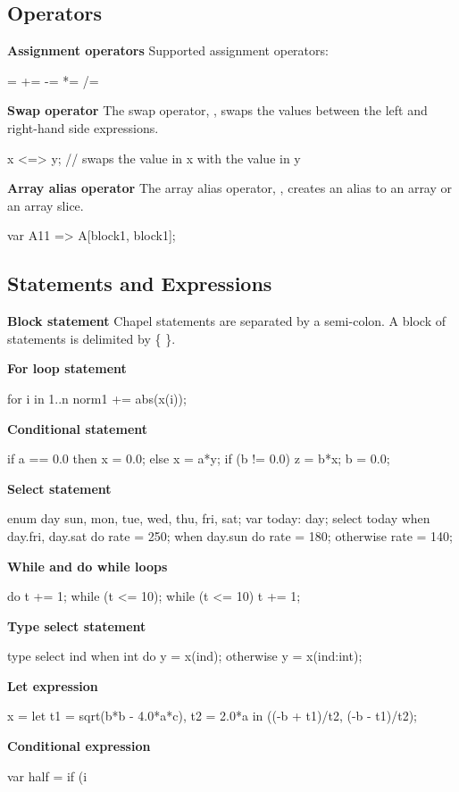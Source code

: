 \documentclass[landscape]{report}
\begin{document}
{\subsection*{Operators}  
{\bf Assignment operators} \newline
Supported assignment operators:
\begin{chapel}
 = += -= *= /= %
\end{chapel}
{\bf Swap operator} \newline
The swap operator, \chpl{<=>}, swaps the values between
the left and right-hand side expressions.
\begin{chapel}
x <=> y; // swaps the value in x with the value in y
\end{chapel}
{\bf Array alias operator} \newline
The array alias operator, \chpl{=>}, creates an alias
to an array or an array slice.  
\begin{chapel}
var A11 => A[block1, block1];
\end{chapel}
\subsection*{Statements and Expressions}
{\bf Block statement} \newline
Chapel statements are separated by a semi-colon.  A block
of statements is delimited by \{ \}.  

{\bf For loop statement} 
\begin{chapel} 
for i in 1..n {
  norm1 += abs(x(i));
}
\end{chapel} 
{\bf Conditional statement}
\begin{chapel} 
if a == 0.0 
then x = 0.0;
else x = a*y;
if (b != 0.0) {
  z = b*x;
  b = 0.0;
}
\end{chapel} 
{\bf Select statement}   
\begin{chapel} 
enum day {sun, mon, tue, wed, thu, fri, sat};
var today: day;
select today {
  when day.fri, day.sat do rate = 250;
  when day.sun do rate = 180;
  otherwise rate = 140;
}
\end{chapel} 
{\bf While and do while loops} 
\begin{chapel} 
do {
  t += 1;
} while (t <= 10);
while (t <= 10) {
  t += 1;
}
\end{chapel} 
\vspace{.7in}
{\bf Type select statement} 
\begin{chapel} 
type select ind {
  when int do y = x(ind); 
  otherwise y = x(ind:int);
}
\end{chapel} 
{\bf Let expression} 
\begin{chapel} 
x = let t1 = sqrt(b*b - 4.0*a*c), t2 = 2.0*a 
    in ((-b + t1)/t2, (-b - t1)/t2);
\end{chapel}
{\bf Conditional expression}  
\begin{chapel} 
var half = if (i %
\end{chapel}
}
\end{document}

